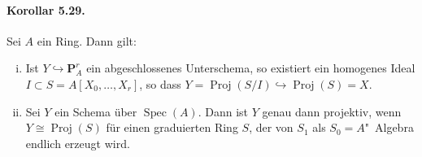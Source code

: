 \documentclass[11pt,b5paper,openany]{memoir}
\begin{document}
\paragraph{Korollar 5.29.}\label{5.29} Sei $A$ ein Ring. Dann gilt:
\begin{enumerate}[(i)]
\item Ist $Y\hookrightarrow\mathbf{P}_A^r$ ein abgeschlossenes Unterschema, so existiert ein homogenes Ideal $I\subset S=A[X_0,\ldots,X_r]$, so dass $Y=\operatorname{Proj}(S/I)\hookrightarrow\operatorname{Proj}(S)=X$.
\item Sei $Y$ ein Schema über $\operatorname{Spec}(A)$. Dann ist $Y$ genau dann projektiv, wenn $Y\cong\operatorname{Proj}(S)$ für einen graduierten Ring $S$, der von $S_1$ als $S_0=A$"~Algebra endlich erzeugt wird.
\end{enumerate}
\end{document}
